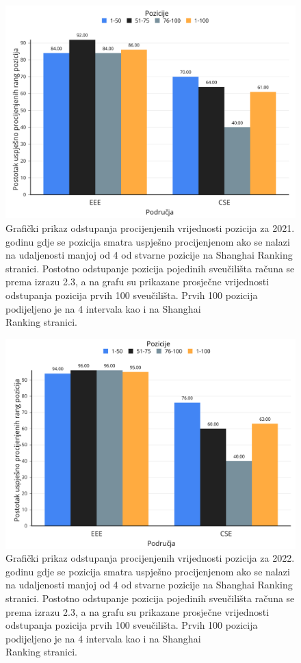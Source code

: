 \documentclass[times, utf8, zavrsni]{fer}
\begin{document}
\begin{figure}[htb]
    \centering
    \includegraphics[scale=0.21]{pozicije2021.png}
    \caption{Grafički prikaz odstupanja procijenjenih vrijednosti pozicija za 2021. godinu gdje se pozicija smatra uspješno procijenjenom ako se nalazi 
    na udaljenosti manjoj od 4 od stvarne pozicije na Shanghai Ranking stranici. Postotno odstupanje pozicija pojedinih sveučilišta računa se prema izrazu 2.3, a 
    na grafu su prikazane prosječne vrijednosti odstupanja pozicija prvih 100 sveučilišta. Prvih 100 pozicija podijeljeno je na 4 intervala kao i na Shanghai \\Ranking stranici.}
    \label{fig:pozicije2021}
    \end{figure} 
    \begin{figure}[htb]
        \centering
        \includegraphics[scale=0.21]{pozicije2022.png}
        \caption{Grafički prikaz odstupanja procijenjenih vrijednosti pozicija za 2022. godinu gdje se pozicija smatra uspješno procijenjenom ako se nalazi 
        na udaljenosti manjoj od 4 od stvarne pozicije na Shanghai Ranking stranici. Postotno odstupanje pozicija pojedinih sveučilišta računa se prema izrazu 2.3, a 
        na grafu su prikazane prosječne vrijednosti odstupanja pozicija prvih 100 sveučilišta. Prvih 100 pozicija podijeljeno je na 4 intervala kao i na Shanghai \\Ranking stranici.}
        \label{fig:pozicije2022}
        \end{figure}   
\end{document}
